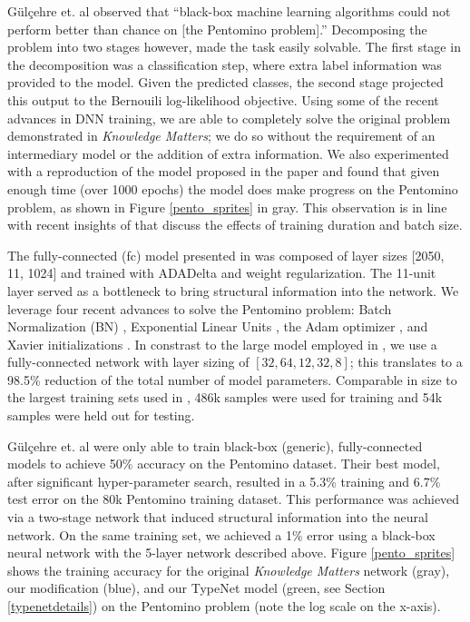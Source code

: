 G\"{u}l\c{c}ehre et. al \cite{gulccehre2016knowledge} observed that
``black-box machine  learning  algorithms  could  not  perform  better 
than  chance on [the Pentomino problem].'' Decomposing
the problem into two stages however, made the task easily solvable. The
first stage in the decomposition was a classification
step, where extra label information was provided to the model. Given the
predicted classes, the second stage projected this output to the Bernouili
log-likelihood objective. Using some of the recent advances in 
DNN training, we are able to completely solve the original
problem demonstrated in {\em Knowledge Matters}; we do so without the
requirement of an intermediary model or the addition of extra
information. We also experimented with a reproduction of the model 
proposed in the paper and found that given enough time (over 1000
epochs) the model does make progress on the Pentomino problem, as shown
in Figure \ref{pento_sprites} in gray. This observation is in line with
recent insights of \cite{hoffer2017train} that discuss the effects of
training duration and batch size.

The fully-connected (fc) model presented in \cite{gulccehre2016knowledge} was composed of layer sizes
[2050, 11, 1024] and trained with ADADelta \cite{zeiler2012adadelta} and weight regularization. The 11-unit layer
served as a bottleneck to bring structural information into the
network.  We leverage four recent advances to solve the Pentomino problem: Batch
Normalization (BN) \cite{ioffe2015batch}, Exponential Linear Units
\cite{clevert2015fast}, the Adam optimizer \cite{kingma2014adam}, and
Xavier initializations \cite{glorot2010understanding}. In constrast to
the large model employed in \cite{gulccehre2016knowledge}, we use a
fully-connected network with layer sizing of
$[32, 64, 12, 32, 8]$; this translates to a 98.5\% reduction of the
total number of model parameters. Comparable in size to the largest
training sets used in \cite{gulccehre2016knowledge}, 486k
samples were used for training and 54k samples were held out for testing.

G\"{u}l\c{c}ehre et. al \cite{gulccehre2016knowledge} were only able to
train black-box (generic), fully-connected models to achieve 50\% accuracy on the
Pentomino dataset. Their best model, after significant
hyper-parameter search, resulted in a 5.3\% training and 6.7\% test error
on the 80k Pentomino training dataset. This performance was achieved 
via a two-stage network that induced structural information
into the neural network. On the same training set, we achieved a 1\% error using a black-box neural network with the
5-layer network described above.  Figure
\ref{pento_sprites} shows the training accuracy for the original
{\em Knowledge Matters} network (gray), our modification (blue), and our TypeNet model (green, see Section \ref{typenetdetails}) on
the Pentomino problem (note the log scale on the x-axis).
